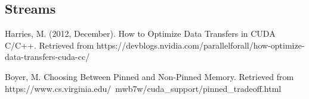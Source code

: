 \documentclass[letterpaper, 11 pt, conference]{ieeeconf}  %
\begin{document}
\subsection{Streams}


\begin{thebibliography}{9}
Harries, M. (2012, December). How to Optimize Data Transfers in CUDA C/C++. Retrieved from https://devblogs.nvidia.com/parallelforall/how-optimize-data-transfers-cuda-cc/
	
Boyer, M. Choosing Between Pinned and Non-Pinned Memory. Retrieved from https://www.cs.virginia.edu/~mwb7w/cuda_support/pinned_tradeoff.html
	
	

\end{thebibliography}
\end{document}

